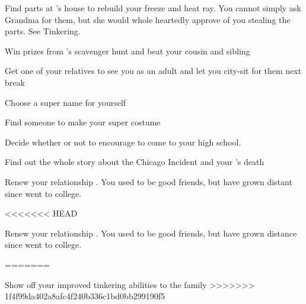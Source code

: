 \documentclass[char]{LRSguildcamp1}
\begin{document}
 
\begin{itemz}[Goals]
	\item Find parts at \cGrandma{}'s house to rebuild your freeze and heat ray. You cannot simply ask Grandma for them, but she would whole heartedly approve of you stealing the parts. See Tinkering. 
	\item Win prizes from \cGrandma{}'s scavenger hunt and beat your cousin and sibling
	
		\item Get one of your relatives to see you as an adult and let you city-sit for them next break
		
		\item Choose a super name for yourself
		
		\item Find someone to make your super costume 
		
		\item Decide whether or not to encourage \cTween{} to come to your high school.
		
		\item Find out the whole story about the Chicago Incident and your \cAS{\paren}'s death
		
		\item Renew your relationship \cGrad{}. You used to be good friends, but have grown distant since \cGrad{} went to college.
		
<<<<<<< HEAD
		\item Renew your relationship \cGrad{}. You used to be good friends, but have grown distance since \cGrad{} went to college.
		   
=======
		\item Show off your improved tinkering abilities to the family
>>>>>>> 1f4f99da402a8afc4f240b336c1bd0bb299190f5
		
\end{itemz}
\end{document}
